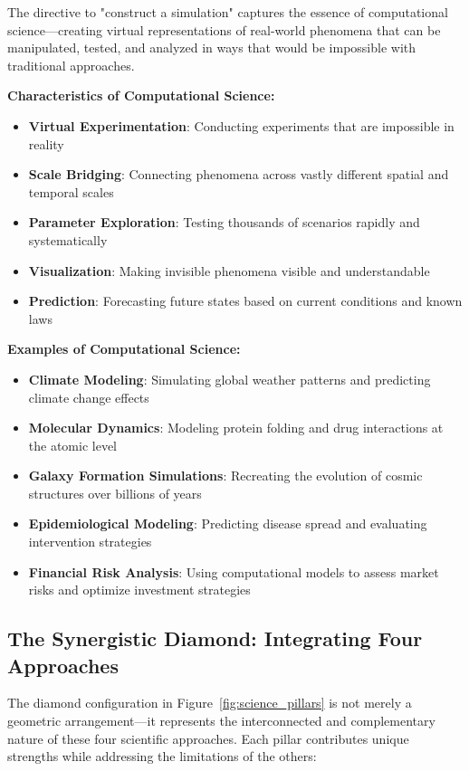 The directive to "construct a simulation" captures the essence of computational science—creating virtual representations of real-world phenomena that can be manipulated, tested, and analyzed in ways that would be impossible with traditional approaches.

\textbf{Characteristics of Computational Science:}
\begin{itemize}
    \item \textbf{Virtual Experimentation}: Conducting experiments that are impossible in reality
    \item \textbf{Scale Bridging}: Connecting phenomena across vastly different spatial and temporal scales
    \item \textbf{Parameter Exploration}: Testing thousands of scenarios rapidly and systematically
    \item \textbf{Visualization}: Making invisible phenomena visible and understandable
    \item \textbf{Prediction}: Forecasting future states based on current conditions and known laws
\end{itemize}

\textbf{Examples of Computational Science:}
\begin{itemize}
    \item \textbf{Climate Modeling}: Simulating global weather patterns and predicting climate change effects
    \item \textbf{Molecular Dynamics}: Modeling protein folding and drug interactions at the atomic level
    \item \textbf{Galaxy Formation Simulations}: Recreating the evolution of cosmic structures over billions of years
    \item \textbf{Epidemiological Modeling}: Predicting disease spread and evaluating intervention strategies
    \item \textbf{Financial Risk Analysis}: Using computational models to assess market risks and optimize investment strategies
\end{itemize}

\subsection{The Synergistic Diamond: Integrating Four Approaches}

The diamond configuration in Figure~\ref{fig:science_pillars} is not merely a geometric arrangement—it represents the interconnected and complementary nature of these four scientific approaches. Each pillar contributes unique strengths while addressing the limitations of the others:


